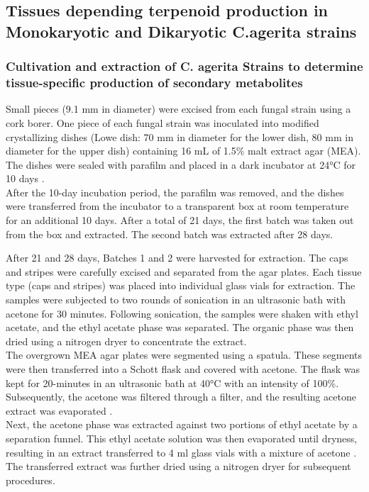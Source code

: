 \subsection{ Tissues depending terpenoid production in Monokaryotic and Dikaryotic C.agerita strains}

\subsubsection{Cultivation and extraction of C. agerita Strains to determine tissue-specific production of secondary metabolites}
Small pieces (9.1 mm in diameter) were excised from each fungal strain using a cork borer. One piece of each fungal strain was inoculated into modified crystallizing dishes (Lowe dish: 70 mm in diameter for the lower dish, 80 mm in diameter for the upper dish) containing 16 mL of 1.5\% malt extract agar (MEA). The dishes were sealed with parafilm and placed in a dark incubator at 24°C for 10 days \cite{Orban2020}.\\

After the 10-day incubation period, the parafilm was removed, and the dishes were transferred from the incubator to a transparent box at room temperature for an additional 10 days. After a total of 21 days, the first batch was taken out from the box and extracted. The second batch was extracted after 28 days.

After 21 and 28 days, Batches 1 and 2 were harvested for extraction. The caps and stripes were carefully excised and separated from the agar plates. Each tissue type (caps and stripes) was placed into individual glass vials for extraction. The samples were subjected to two rounds of sonication in an ultrasonic bath with acetone for 30 minutes. Following sonication, the samples were shaken with ethyl acetate, and the ethyl acetate phase was separated. The organic phase was then dried using a nitrogen dryer to concentrate the extract.\\

The overgrown MEA agar plates were segmented using a spatula. These segments were then transferred into a Schott flask and covered with acetone. The flask was kept for 20-minutes in an ultrasonic bath at 40°C with an intensity of 100\%. Subsequently, the acetone was filtered through a filter, and the resulting acetone extract was evaporated \cite{Harms2021}.\\

Next, the acetone phase was extracted against two portions of ethyl acetate by a separation funnel. This ethyl acetate solution was then evaporated until dryness, resulting in an extract transferred to 4 ml glass vials with a mixture of acetone . The transferred extract was further dried using a nitrogen dryer for subsequent procedures.


